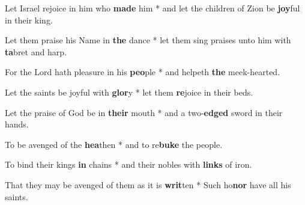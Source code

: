 \begin{multicols}{2}
	Let Israel rejoice in him who \textbf{made} him * and let the children of Zion be \textbf{joy}ful in their king.
	
	Let them praise his Name in \textbf{the} dance * let them sing praises unto him with \textbf{ta}bret and harp.
	
	For the Lord hath pleasure in his \textbf{peo}ple * and helpeth \textbf{the} meek-hearted.
	
	Let the saints be joyful with \textbf{glor}y * let them \textbf{re}joice in their beds.
	
	Let the praise of God be in \textbf{their} mouth * and a two-\textbf{edged} sword in their hands.
	
	To be avenged of the \textbf{hea}then * and to re\textbf{buke} the people.
	
	To bind their kings \textbf{in} chains * and their nobles with \textbf{links} of iron.
	
	That they may be avenged of them as it is \textbf{writ}ten * Such ho\textbf{nor} have all his saints.
\end{multicols}